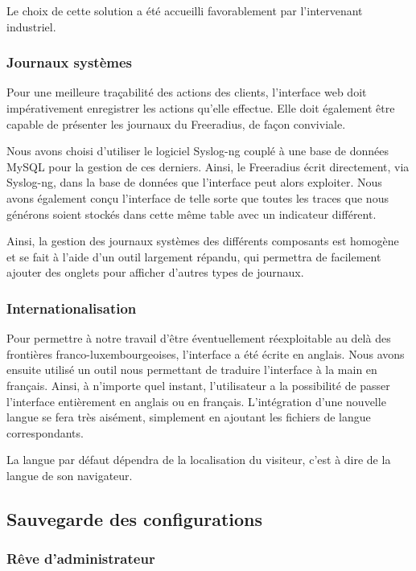 Le choix de cette solution a été accueilli favorablement par l'intervenant industriel.

\subsubsection{Journaux systèmes}

Pour une meilleure traçabilité des actions des clients, l'interface web doit impérativement enregistrer les actions qu'elle effectue. Elle doit également être capable de présenter les journaux du Freeradius, de façon conviviale.

Nous avons choisi d'utiliser le logiciel Syslog-ng couplé à une base de données MySQL pour la gestion de ces derniers. Ainsi, le Freeradius écrit directement, via Syslog-ng, dans la base de données que l'interface peut alors exploiter. Nous avons également conçu l'interface de telle sorte que toutes les traces que nous générons soient stockés dans cette même table avec un indicateur différent.

Ainsi, la gestion des journaux systèmes des différents composants est homogène et se fait à l'aide d'un outil largement répandu, qui permettra de facilement ajouter des onglets pour afficher d'autres types de journaux.

\subsubsection{Internationalisation}

Pour permettre à notre travail d'être éventuellement réexploitable au delà des frontières franco-luxembourgeoises, l'interface a été écrite en anglais. Nous avons ensuite utilisé un outil nous permettant de traduire l'interface à la main en français. Ainsi, à n'importe quel instant, l'utilisateur a la possibilité de passer l'interface entièrement en anglais ou en français. L'intégration d'une nouvelle langue se fera très aisément, simplement en ajoutant les fichiers de langue correspondants.

La langue par défaut dépendra de la localisation du visiteur, c'est à dire de la langue de son navigateur.

\subsection{Sauvegarde des configurations}
\label{chap-sauvegardes}
\subsubsection{Rêve d'administrateur}

